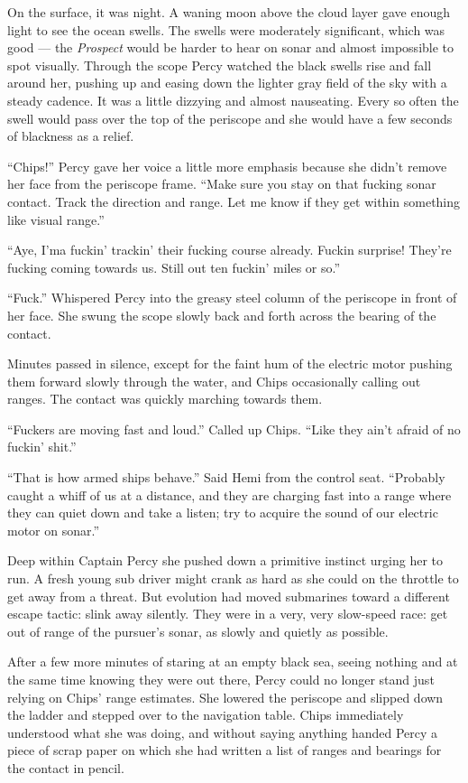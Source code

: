 \documentclass[]{scrbook}
\begin{document}
On the surface, it was night. A waning moon above the cloud layer gave
enough light to see the ocean swells. The swells were moderately
significant, which was good --- the \emph{Prospect} would be harder to
hear on sonar and almost impossible to spot visually. Through the scope
Percy watched the black swells rise and fall around her, pushing up and
easing down the lighter gray field of the sky with a steady cadence. It
was a little dizzying and almost nauseating. Every so often the swell
would pass over the top of the periscope and she would have a few
seconds of blackness as a relief.

``Chips!'' Percy gave her voice a little more emphasis because she
didn't remove her face from the periscope frame. ``Make sure you stay on
that fucking sonar contact. Track the direction and range. Let me know
if they get within something like visual range.''

``Aye, I'ma fuckin' trackin' their fucking course already. Fuckin
surprise! They're fucking coming towards us. Still out ten fuckin' miles
or so.''

``Fuck.'' Whispered Percy into the greasy steel column of the periscope
in front of her face. She swung the scope slowly back and forth across
the bearing of the contact.

Minutes passed in silence, except for the faint hum of the electric
motor pushing them forward slowly through the water, and Chips
occasionally calling out ranges. The contact was quickly marching
towards them.

``Fuckers are moving fast and loud.'' Called up Chips. ``Like they ain't
afraid of no fuckin' shit.''

``That is how armed ships behave.'' Said Hemi from the control seat.
``Probably caught a whiff of us at a distance, and they are charging
fast into a range where they can quiet down and take a listen; try to
acquire the sound of our electric motor on sonar.''

Deep within Captain Percy she pushed down a primitive instinct urging
her to run. A fresh young sub driver might crank as hard as she could on
the throttle to get away from a threat. But evolution had moved
submarines toward a different escape tactic: slink away silently. They
were in a very, very slow-speed race: get out of range of the pursuer's
sonar, as slowly and quietly as possible.

After a few more minutes of staring at an empty black sea, seeing
nothing and at the same time knowing they were out there, Percy could no
longer stand just relying on Chips' range estimates. She lowered the
periscope and slipped down the ladder and stepped over to the navigation
table. Chips immediately understood what she was doing, and without
saying anything handed Percy a piece of scrap paper on which she had
written a list of ranges and bearings for the contact in pencil.
\end{document}
